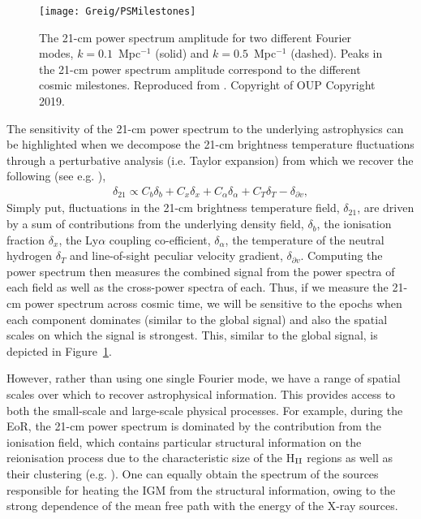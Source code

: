 \begin{figure}[]
\begin{center}
\texttt{[image: Greig/PSMilestones]}
\end{center}
\caption{The 21-cm power spectrum amplitude for two different Fourier modes, $k=0.1$~Mpc$^{-1}$ (solid) and $k=0.5$~Mpc$^{-1}$ (dashed). Peaks in the 21-cm power spectrum amplitude correspond to the different cosmic milestones. Reproduced from \cite{Mesinger:2016}. Copyright of OUP Copyright 2019.}
\label{fig:PSMilestones}
\end{figure}

The sensitivity of the 21-cm power spectrum to the underlying astrophysics can be highlighted when we decompose the 21-cm brightness temperature fluctuations through a perturbative analysis (i.e. Taylor expansion) from which we recover the following (see e.g. \cite{Barkana:2005,Santos:2005,Mao:2008}),
\begin{eqnarray}
\delta_{21} \propto C_{b}\delta_{b} + C_{x}\delta_{x} + C_{\alpha}\delta_{\alpha} + C_{T}\delta_{T} - \delta_{\partial v},
\end{eqnarray}
Simply put, fluctuations in the 21-cm brightness temperature field, $\delta_{21}$, are driven by a sum of contributions from the underlying density field, $\delta_{b}$, the ionisation fraction $\delta_{x}$, the Ly$\alpha$ coupling co-efficient, $\delta_{\alpha}$, the temperature of the neutral hydrogen $\delta_{T}$ and line-of-sight peculiar velocity gradient, $\delta_{\partial v}$. Computing the power spectrum then measures the combined signal from the power spectra of each field as well as the cross-power spectra of each. Thus, if we measure the 21-cm power spectrum across cosmic time, we will be sensitive to the epochs when each component dominates (similar to the global signal) and also the spatial scales on which the signal is strongest. This, similar to the global signal, is depicted in Figure~\ref{fig:PSMilestones}.

However, rather than using one single Fourier mode, we have a range of spatial scales over which to recover astrophysical information. This provides access to both the small-scale and large-scale physical processes. For example, during the EoR, the 21-cm power spectrum is dominated by the contribution from the ionisation field, which contains particular structural information on the reionisation process due to the characteristic size of the H$_{\rm \scriptsize II}$ regions as well as their clustering (e.g. \cite{Lidz:2008}). One can equally obtain the spectrum of the sources responsible for heating the IGM from the structural information, owing to the strong dependence of the mean free path with the energy of the X-ray sources. 

